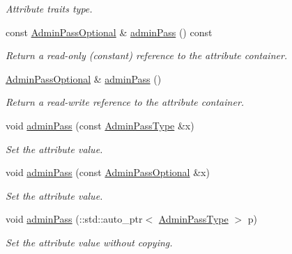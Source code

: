 \begin{DoxyCompactItemize}
\begin{DoxyCompactList}\small\item\em Attribute traits type. \item\end{DoxyCompactList}\item 
const \hyperlink{classopenstack_1_1xml_1_1Server_a32f6b9381619923d13b82a0a8a964893}{AdminPassOptional} \& \hyperlink{classopenstack_1_1xml_1_1Server_a39ba7ba6737309be148720887ac63fd5}{adminPass} () const 
\begin{DoxyCompactList}\small\item\em Return a read-\/only (constant) reference to the attribute container. \item\end{DoxyCompactList}\item 
\hyperlink{classopenstack_1_1xml_1_1Server_a32f6b9381619923d13b82a0a8a964893}{AdminPassOptional} \& \hyperlink{classopenstack_1_1xml_1_1Server_ab7798995fe2c94b6ac4866245b251794}{adminPass} ()
\begin{DoxyCompactList}\small\item\em Return a read-\/write reference to the attribute container. \item\end{DoxyCompactList}\item 
void \hyperlink{classopenstack_1_1xml_1_1Server_a25cb0c88e7ae7a15ab3b0897d90a4081}{adminPass} (const \hyperlink{classopenstack_1_1xml_1_1Server_a1fb88fb3dae6adc1c0ac106fafdbe99d}{AdminPassType} \&x)
\begin{DoxyCompactList}\small\item\em Set the attribute value. \item\end{DoxyCompactList}\item 
void \hyperlink{classopenstack_1_1xml_1_1Server_a13fe77e4ecdf975239fccbc15d9745c0}{adminPass} (const \hyperlink{classopenstack_1_1xml_1_1Server_a32f6b9381619923d13b82a0a8a964893}{AdminPassOptional} \&x)
\begin{DoxyCompactList}\small\item\em Set the attribute value. \item\end{DoxyCompactList}\item 
void \hyperlink{classopenstack_1_1xml_1_1Server_a69d718ac6ffdb35a4a0cd2ed15f68b34}{adminPass} (::std::auto\_\-ptr$<$ \hyperlink{classopenstack_1_1xml_1_1Server_a1fb88fb3dae6adc1c0ac106fafdbe99d}{AdminPassType} $>$ p)
\begin{DoxyCompactList}\small\item\em Set the attribute value without copying. \item\end{DoxyCompactList}\end{DoxyCompactItemize}
